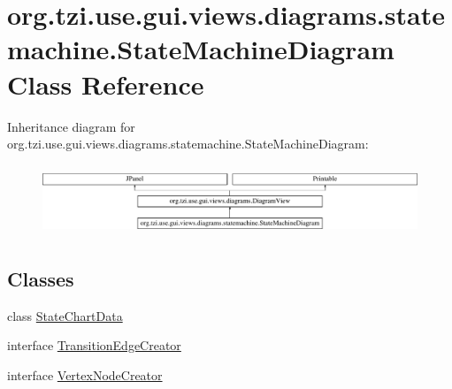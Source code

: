 \hypertarget{classorg_1_1tzi_1_1use_1_1gui_1_1views_1_1diagrams_1_1statemachine_1_1_state_machine_diagram}{\section{org.\-tzi.\-use.\-gui.\-views.\-diagrams.\-statemachine.\-State\-Machine\-Diagram Class Reference}
\label{classorg_1_1tzi_1_1use_1_1gui_1_1views_1_1diagrams_1_1statemachine_1_1_state_machine_diagram}
}
Inheritance diagram for org.\-tzi.\-use.\-gui.\-views.\-diagrams.\-statemachine.\-State\-Machine\-Diagram\-:\begin{figure}[H]
\begin{center}
\leavevmode
\includegraphics[height=2.121212cm]{classorg_1_1tzi_1_1use_1_1gui_1_1views_1_1diagrams_1_1statemachine_1_1_state_machine_diagram}
\end{center}
\end{figure}
\subsection*{Classes}
\begin{DoxyCompactItemize}
\item 
class \hyperlink{classorg_1_1tzi_1_1use_1_1gui_1_1views_1_1diagrams_1_1statemachine_1_1_state_machine_diagram_1_1_state_chart_data}{State\-Chart\-Data}
\item 
interface \hyperlink{interfaceorg_1_1tzi_1_1use_1_1gui_1_1views_1_1diagrams_1_1statemachine_1_1_state_machine_diagram_1_1_transition_edge_creator}{Transition\-Edge\-Creator}
\item 
interface \hyperlink{interfaceorg_1_1tzi_1_1use_1_1gui_1_1views_1_1diagrams_1_1statemachine_1_1_state_machine_diagram_1_1_vertex_node_creator}{Vertex\-Node\-Creator}
\end{DoxyCompactItemize}
